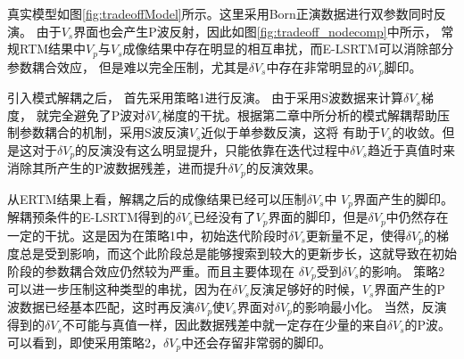真实模型如图\ref{fig:tradeoffModel}所示。这里采用Born正演数据进行双参数同时反演。
由于$V_s$界面也会产生P波反射，因此如图\ref{fig:tradeoff_nodecomp}中所示，
常规RTM结果中$V_p$与$V_s$成像结果中存在明显的相互串扰，而E-LSRTM可以消除部分参数耦合效应，
但是难以完全压制，尤其是$\delta V_s$中存在非常明显的$\delta V_p$脚印。

引入模式解耦之后，
首先采用策略1进行反演。
由于采用S波数据来计算$\delta V_s$梯度，
就完全避免了P波对$\delta
V_s$梯度的干扰。根据第二章中所分析的模式解耦帮助压制参数耦合的机制，采用S波反演$V_s$近似于单参数反演，这将
有助于$V_s$的收敛。但是这对于$\delta
V_p$的反演没有这么明显提升，只能依靠在迭代过程中$\delta
V_s$趋近于真值时来消除其所产生的P波数据残差，进而提升$\delta V_p$的反演效果。

从ERTM结果上看，解耦之后的成像结果已经可以压制$\delta V_s$中
$V_p$界面产生的脚印。解耦预条件的E-LSRTM得到的$\delta
V_s$已经没有了$V_p$界面的脚印，但是$\delta
V_p$中仍然存在一定的干扰。这是因为在策略1中，初始迭代阶段时$\delta
V_s$更新量不足，使得$\delta
V_p$的梯度总是受到影响，而这个此阶段总是能够搜索到较大的更新步长，这就导致在初始阶段的参数耦合效应仍然较为严重。而且主要体现在
$\delta V_p$受到$\delta V_s$的影响。
策略2可以进一步压制这种类型的串扰，因为在$\delta
V_s$反演足够好的时候，$V_s$界面产生的P波数据已经基本匹配，这时再反演$\delta
V_p$使$V_s$界面对$\delta V_p$的影响最小化。
当然，反演得到的$\delta V_s$不可能与真值一样，因此数据残差中就一定存在少量的来自$\delta
V_s$的P波。可以看到，即使采用策略2，$\delta V_p$中还会存留非常弱的脚印。


